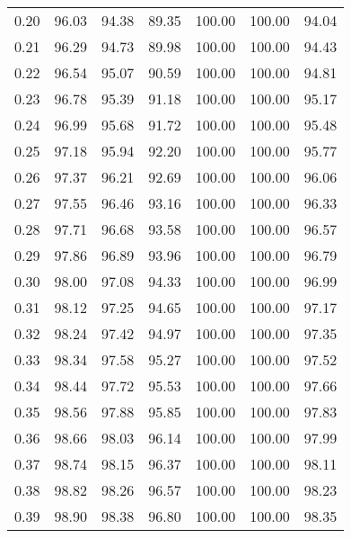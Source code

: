 \begin{tabular}{|c|c|c|c|c|c|c|}
      0.20 &     96.03 &     94.38 &      89.35 &  100.00 &     100.00 &         94.04 \\
      0.21 &     96.29 &     94.73 &      89.98 &  100.00 &     100.00 &         94.43 \\
      0.22 &     96.54 &     95.07 &      90.59 &  100.00 &     100.00 &         94.81 \\
      0.23 &     96.78 &     95.39 &      91.18 &  100.00 &     100.00 &         95.17 \\
      0.24 &     96.99 &     95.68 &      91.72 &  100.00 &     100.00 &         95.48 \\
      0.25 &     97.18 &     95.94 &      92.20 &  100.00 &     100.00 &         95.77 \\
      0.26 &     97.37 &     96.21 &      92.69 &  100.00 &     100.00 &         96.06 \\
      0.27 &     97.55 &     96.46 &      93.16 &  100.00 &     100.00 &         96.33 \\
      0.28 &     97.71 &     96.68 &      93.58 &  100.00 &     100.00 &         96.57 \\
      0.29 &     97.86 &     96.89 &      93.96 &  100.00 &     100.00 &         96.79 \\
      0.30 &     98.00 &     97.08 &      94.33 &  100.00 &     100.00 &         96.99 \\
      0.31 &     98.12 &     97.25 &      94.65 &  100.00 &     100.00 &         97.17 \\
      0.32 &     98.24 &     97.42 &      94.97 &  100.00 &     100.00 &         97.35 \\
      0.33 &     98.34 &     97.58 &      95.27 &  100.00 &     100.00 &         97.52 \\
      0.34 &     98.44 &     97.72 &      95.53 &  100.00 &     100.00 &         97.66 \\
      0.35 &     98.56 &     97.88 &      95.85 &  100.00 &     100.00 &         97.83 \\
      0.36 &     98.66 &     98.03 &      96.14 &  100.00 &     100.00 &         97.99 \\
      0.37 &     98.74 &     98.15 &      96.37 &  100.00 &     100.00 &         98.11 \\
      0.38 &     98.82 &     98.26 &      96.57 &  100.00 &     100.00 &         98.23 \\
      0.39 &     98.90 &     98.38 &      96.80 &  100.00 &     100.00 &         98.35 \\

\end{tabular}
